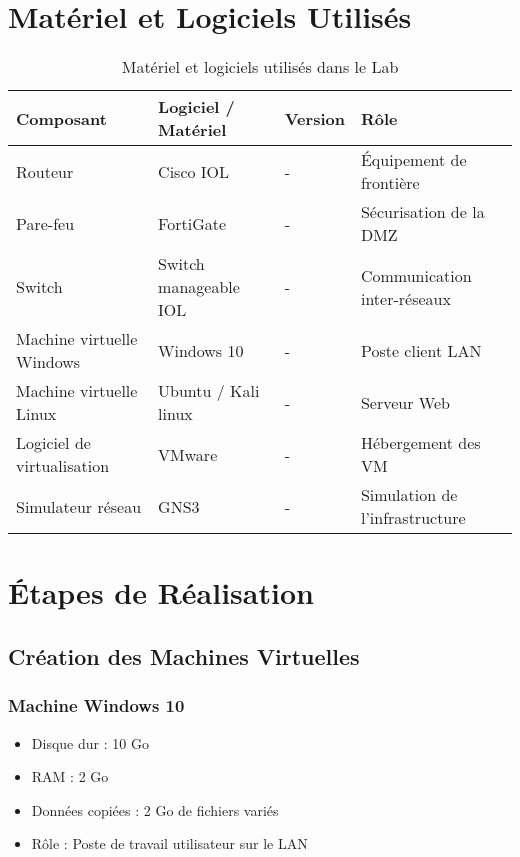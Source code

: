\documentclass[a4paper,12pt]{report}
\begin{document}
\chapter{Matériel et Logiciels Utilisés}

\begin{table}[h!]
\centering
\begin{tabular}{|m{4cm}|m{5cm}|m{2cm}|m{3cm}|}
\hline
\textbf{Composant} & \textbf{Logiciel / Matériel} & \textbf{Version} & \textbf{Rôle} \\ \hline
Routeur & Cisco IOL  & - & Équipement de frontière \\ \hline
Pare-feu & FortiGate  & - & Sécurisation de la DMZ \\ \hline
Switch & Switch manageable IOL & - & Communication inter-réseaux \\ \hline
Machine virtuelle Windows & Windows 10 & - & Poste client LAN \\ \hline
Machine virtuelle Linux & Ubuntu / Kali linux & - & Serveur Web \\ \hline
Logiciel de virtualisation & VMware & - & Hébergement des VM \\ \hline
Simulateur réseau & GNS3 & - & Simulation de l’infrastructure \\ \hline
\end{tabular}
\caption{Matériel et logiciels utilisés dans le Lab}
\end{table}

\chapter{Étapes de Réalisation}

\section{Création des Machines Virtuelles}
\subsection*{Machine Windows 10}
\begin{itemize}
    \item Disque dur : 10 Go
    \item RAM : 2 Go
    \item Données copiées : 2 Go de fichiers variés
    \item Rôle : Poste de travail utilisateur sur le LAN
\end{itemize}
\end{document}
